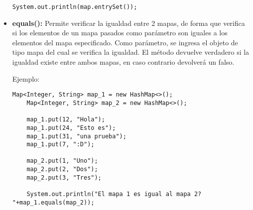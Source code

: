 \documentclass[12pt, letterpaper]{article} %
\begin{document}
\begin{itemize}
\begin{lstlisting}[frame=single]
    System.out.println(map.entrySet());
    \end{lstlisting}

    \item \textbf{equals():} Permite verificar la igualdad entre 2 mapas, de forma que verifica si los elementos de un mapa pasados como parámetro son iguales a los elementos del mapa especificado. Como parámetro, se ingresa el objeto de tipo mapa del cual se verifica la igualdad. El método devuelve verdadero si la igualdad existe entre ambos mapas, en caso contrario devolverá un falso.
    
    Ejemplo:
    \lstset{language = Java, breaklines=true, basicstyle=\footnotesize}
    \begin{lstlisting}[frame=single]
    Map<Integer, String> map_1 = new HashMap<>();
    Map<Integer, String> map_2 = new HashMap<>();

    map_1.put(12, "Hola");
    map_1.put(24, "Esto es");
    map_1.put(31, "una prueba");
    map_1.put(7, ":D");

    map_2.put(1, "Uno");
    map_2.put(2, "Dos");
    map_2.put(3, "Tres");

    System.out.println("El mapa 1 es igual al mapa 2? "+map_1.equals(map_2));
    \end{lstlisting}
\end{itemize}
\end{document}
